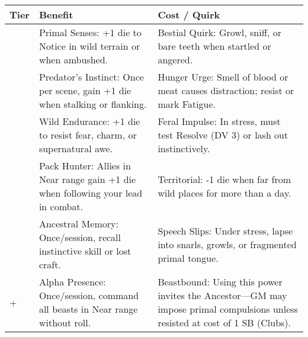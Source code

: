 \begin{longtable}{>{\raggedright\arraybackslash}p{1cm} p{5cm} p{5cm}}
\toprule
\textbf{Tier} & \textbf{Benefit} & \textbf{Cost / Quirk} \\
\midrule
1 & Primal Senses: +1 die to Notice in wild terrain or when ambushed. & Bestial Quirk: Growl, sniff, or bare teeth when startled or angered. \\
\midrule
2 & Predator’s Instinct: Once per scene, gain +1 die when stalking or flanking. & Hunger Urge: Smell of blood or meat causes distraction; resist or mark Fatigue. \\
\midrule
3 & Wild Endurance: +1 die to resist fear, charm, or supernatural awe. & Feral Impulse: In stress, must test Resolve (DV 3) or lash out instinctively. \\
\midrule
4 & Pack Hunter: Allies in Near range gain +1 die when following your lead in combat. & Territorial: -1 die when far from wild places for more than a day. \\
\midrule
5 & Ancestral Memory: Once/session, recall instinctive skill or lost craft. & Speech Slips: Under stress, lapse into snarls, growls, or fragmented primal tongue. \\
\midrule
6+ & Alpha Presence: Once/session, command all beasts in Near range without roll. & Beastbound: Using this power invites the Ancestor—GM may impose primal compulsions unless resisted at cost of 1 SB (Clubs). \\
\bottomrule
\end{longtable}
